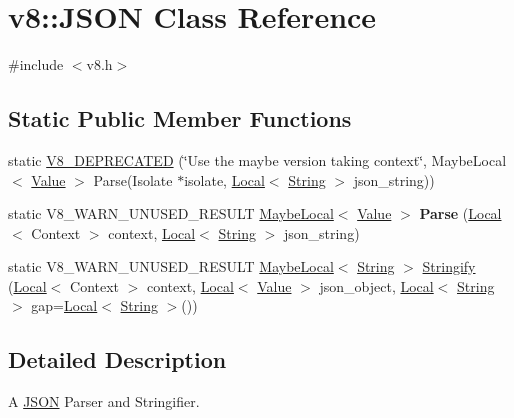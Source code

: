 \hypertarget{classv8_1_1JSON}{}\section{v8\+:\+:J\+S\+ON Class Reference}
\label{classv8_1_1JSON}


{\ttfamily \#include $<$v8.\+h$>$}

\subsection*{Static Public Member Functions}
\begin{DoxyCompactItemize}
\item 
static \mbox{\hyperlink{classv8_1_1JSON_acc5421b3e5d85d3788a1e6cb59403393}{V8\+\_\+\+D\+E\+P\+R\+E\+C\+A\+T\+ED}} (\char`\"{}Use the maybe version taking context\char`\"{}, Maybe\+Local$<$ \mbox{\hyperlink{classv8_1_1Value}{Value}} $>$ Parse(Isolate $\ast$isolate, \mbox{\hyperlink{classv8_1_1Local}{Local}}$<$ \mbox{\hyperlink{classv8_1_1String}{String}} $>$ json\+\_\+string))
\item 
\mbox{\label{classv8_1_1JSON_a32156057e84d1e4406e43df386922a2b}} 
static V8\+\_\+\+W\+A\+R\+N\+\_\+\+U\+N\+U\+S\+E\+D\+\_\+\+R\+E\+S\+U\+LT \mbox{\hyperlink{classv8_1_1MaybeLocal}{Maybe\+Local}}$<$ \mbox{\hyperlink{classv8_1_1Value}{Value}} $>$ {\bfseries Parse} (\mbox{\hyperlink{classv8_1_1Local}{Local}}$<$ Context $>$ context, \mbox{\hyperlink{classv8_1_1Local}{Local}}$<$ \mbox{\hyperlink{classv8_1_1String}{String}} $>$ json\+\_\+string)
\item 
static V8\+\_\+\+W\+A\+R\+N\+\_\+\+U\+N\+U\+S\+E\+D\+\_\+\+R\+E\+S\+U\+LT \mbox{\hyperlink{classv8_1_1MaybeLocal}{Maybe\+Local}}$<$ \mbox{\hyperlink{classv8_1_1String}{String}} $>$ \mbox{\hyperlink{classv8_1_1JSON_a2d760d688469ecf890cc9bf2d1b5b966}{Stringify}} (\mbox{\hyperlink{classv8_1_1Local}{Local}}$<$ Context $>$ context, \mbox{\hyperlink{classv8_1_1Local}{Local}}$<$ \mbox{\hyperlink{classv8_1_1Value}{Value}} $>$ json\+\_\+object, \mbox{\hyperlink{classv8_1_1Local}{Local}}$<$ \mbox{\hyperlink{classv8_1_1String}{String}} $>$ gap=\mbox{\hyperlink{classv8_1_1Local}{Local}}$<$ \mbox{\hyperlink{classv8_1_1String}{String}} $>$())
\end{DoxyCompactItemize}


\subsection{Detailed Description}
A \mbox{\hyperlink{classv8_1_1JSON}{J\+S\+ON}} Parser and Stringifier. 

